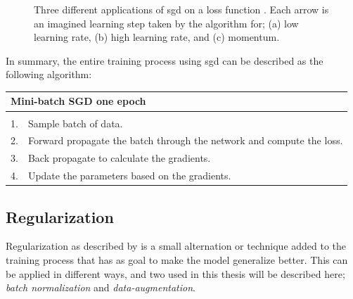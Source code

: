     \begin{figure}[H]
        \centering

        
        \caption[Learning rates]{Three different applications of \gls{sgd} on a loss function . Each arrow is an imagined learning step taken by the algorithm for; (a) low learning rate, (b) high learning rate, and (c) momentum.}
      	\medskip 
        \label{learning_rates}
    \end{figure}

    In summary, the entire training process using \gls{sgd} can be described as the following algorithm\cite{farsal2018deep}:
    
    \begin{longtable}{lllllll} \label{sgd algorithm}\\
    \hline
    \multicolumn{7}{l}{Mini-batch SGD one epoch}                                                              \\ \hline
    \endfirsthead
    \endhead
    \hline
    \endfoot
    \endlastfoot
    \multicolumn{7}{l}{Loop:}                                                                       \\
    1.   & \multicolumn{6}{l}{Sample batch of data.}                                                \\
    2.   & \multicolumn{6}{l}{Forward propagate the batch through the network and compute the loss.} \\
    3.   & \multicolumn{6}{l}{Back propagate to calculate the gradients.}                            \\
    4.   & \multicolumn{6}{l}{Update the parameters based on the gradients.}                         \\ \hline
    \end{longtable}
    
    

    
\subsection{Regularization}
    Regularization as described by \citeauthor{kukavcka2017_regularization}\cite{kukavcka2017_regularization} is a small alternation or technique added to the training process that has as goal to make the model generalize better. This can be applied in different ways, and two used in this thesis will be described here; \textit{batch normalization} and \textit{data-augmentation}.
    
